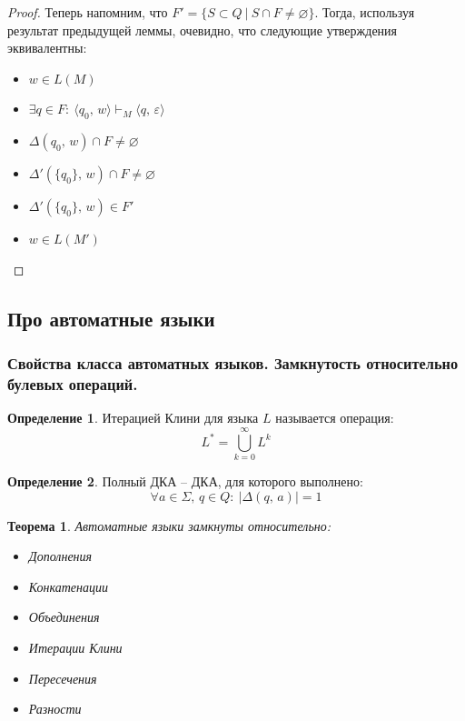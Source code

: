 \documentclass[a4paper,12pt]{article}
\renewcommand{\emptyset}{\ensuremath{\varnothing}}
\theoremstyle{plain}
\newtheorem{theorem}{Теорема}[subsection]
\theoremstyle{definition}
\newtheorem{definition}{Определение}[subsection]
\theoremstyle{remark}
\begin{document}
\begin{proof}
	Теперь напомним, что $F' = \{S \subset Q \:|\: S \cap F \neq \emptyset\}$. Тогда, используя результат предыдущей леммы, очевидно, что следующие утверждения эквивалентны:
	\begin{itemize}
		\item $w \in L(M)$
		\item $\exists q \in F :\: \langle q_0,\, w\rangle \vdash_M \langle q,\, \varepsilon\rangle$
		\item $\Delta(q_0,\, w) \cap F \neq \emptyset$
		\item $\Delta'(\{q_0\},\, w) \cap F \neq \emptyset$
		\item $\Delta'(\{q_0\},\, w) \in F'$
		\item $w \in L(M')$
	\end{itemize}
\end{proof}

\subsection{Про автоматные языки}
\subsubsection*{Свойства класса автоматных языков. Замкнутость относительно булевых операций.}
\begin{definition}
	Итерацией Клини для языка $L$ называется операция:
	\[L^* = \bigcup_{k = 0}^\infty L^k\]
\end{definition}

\begin{definition}
	Полный ДКА -- ДКА, для которого выполнено:
	\[
		\forall a \in \Sigma,\, q \in Q :\: |\Delta(q,\, a)| = 1
	\]
\end{definition}

\begin{theorem}
	Автоматные языки замкнуты относительно:
	\begin{itemize}
		\item Дополнения
		\item Конкатенации
		\item Объединения
		\item Итерации Клини
		\item Пересечения
		\item Разности
	\end{itemize}
\end{theorem}
\end{document}
